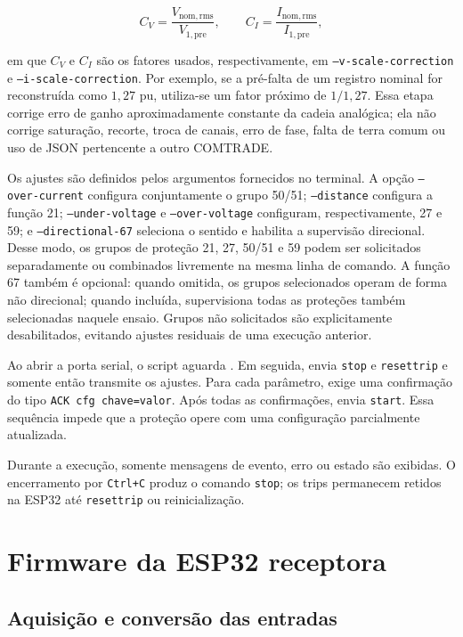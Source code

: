 \begin{equation}
  C_V=\frac{V_{\mathrm{nom,rms}}}{V_{1,\mathrm{pre}}}, \qquad
  C_I=\frac{I_{\mathrm{nom,rms}}}{I_{1,\mathrm{pre}}},
  \label{eq:correcao-escala-receptor}
\end{equation}

em que $C_V$ e $C_I$ são os fatores usados, respectivamente, em \texttt{--v-scale-correction} e \texttt{--i-scale-correction}. Por exemplo, se a pré-falta de um registro nominal for reconstruída como $1{,}27$ pu, utiliza-se um fator próximo de $1/1{,}27$. Essa etapa corrige erro de ganho aproximadamente constante da cadeia analógica; ela não corrige saturação, recorte, troca de canais, erro de fase, falta de terra comum ou uso de JSON pertencente a outro COMTRADE.

Os ajustes são definidos pelos argumentos fornecidos no terminal. A opção \texttt{--over-current} configura conjuntamente o grupo 50/51; \texttt{--distance} configura a função 21; \texttt{--under-voltage} e \texttt{--over-voltage} configuram, respectivamente, 27 e 59; e \texttt{--directional-67} seleciona o sentido e habilita a supervisão direcional. Desse modo, os grupos de proteção 21, 27, 50/51 e 59 podem ser solicitados separadamente ou combinados livremente na mesma linha de comando. A função 67 também é opcional: quando omitida, os grupos selecionados operam de forma não direcional; quando incluída, supervisiona todas as proteções também selecionadas naquele ensaio. Grupos não solicitados são explicitamente desabilitados, evitando ajustes residuais de uma execução anterior.

Ao abrir a porta serial, o script aguarda . Em seguida, envia \texttt{stop} e \texttt{resettrip} e somente então transmite os ajustes. Para cada parâmetro, exige uma confirmação do tipo \texttt{ACK cfg chave=valor}. Após todas as confirmações, envia \texttt{start}. Essa sequência impede que a proteção opere com uma configuração parcialmente atualizada.

Durante a execução, somente mensagens de evento, erro ou estado são exibidas. O encerramento por \texttt{Ctrl+C} produz o comando \texttt{stop}; os trips permanecem retidos na ESP32 até \texttt{resettrip} ou reinicialização.

\section{Firmware da ESP32 receptora}

\subsection{Aquisição e conversão das entradas}

